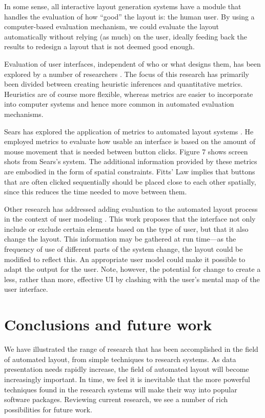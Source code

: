     In some sense, all interactive layout generation systems have a module that handles the evaluation of how “good” the layout is: the human user. By using a computer-based evaluation mechanism, we could evaluate the layout automatically without relying (as much) on the user, ideally feeding back the results to redesign a layout that is not deemed good enough.

    Evaluation of user interfaces, independent of who or what designs them, has been explored by a number of researchers \citep{tullis-1,sears-1,sears-3,comver-1,jeffries-1}. The focus of this research has primarily been divided between creating heuristic inferences and quantitative metrics. Heuristics are of course more flexible, whereas metrics are easier to incorporate into computer systems and hence more common in automated evaluation mechanisms.

    Sears has explored the application of metrics to automated layout systems \citep{sears-2}. He employed metrics to evaluate how usable an interface is based on the amount of mouse movement that is needed between button clicks. Figure 7 shows screen shots from Sears’s system. The additional information provided by these metrics are embodied in the form of spatial constraints. Fitts’ Law \citep{mackenzie-1} implies that buttons that are often clicked sequentially should be placed close to each other spatially, since this reduces the time needed to move between them.

    Other research has addressed adding evaluation to the automated layout process in the context of user modeling \citep{schlungbaum-1}. This work proposes that the interface not only include or exclude certain elements based on the type of user, but that it also change the layout. This information may be gathered at run time—as the frequency of use of different parts of the system change, the layout could be modified to reflect this. An appropriate user model could make it possible to adapt the output for the user. Note, however, the potential for change to create a less, rather than more, effective UI by clashing with the user’s mental map of the user interface.

    \section{Conclusions and future work}
    \label{conclusions-layout-paper}

    We have illustrated the range of research that has been accomplished in the field of automated layout, from simple techniques to research systems. As data presentation needs rapidly increase, the field of automated layout will become increasingly important. In time, we feel it is inevitable that the more powerful techniques found in the research systems will make their way into popular software packages. Reviewing current research, we see a number of rich possibilities for future work.

